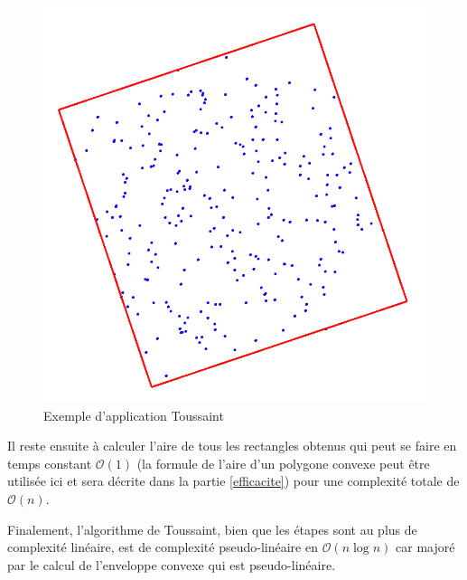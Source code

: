 \begin{figure}[ht]
\begin{center}
\includegraphics[scale=0.25]{images/ex_toussaint.png}
\caption{Exemple d'application Toussaint}
\end{center}
\end{figure}

Il reste ensuite à calculer l'aire de tous les rectangles obtenus qui peut se faire en temps constant $\mathcal{O}(1)$ (la formule de l'aire d'un polygone convexe peut être utilisée ici et sera décrite dans la partie \ref{efficacite}) pour une complexité totale de $\mathcal{O}(n)$.

Finalement, l'algorithme de Toussaint, bien que les étapes sont au plus de complexité linéaire, est de complexité pseudo-linéaire en $\mathcal{O}(n\log{n})$ car majoré par le calcul de l'enveloppe convexe qui est pseudo-linéaire.
\newpage